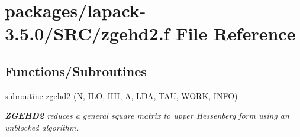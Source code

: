 \hypertarget{zgehd2_8f}{}\section{packages/lapack-\/3.5.0/\+S\+R\+C/zgehd2.f File Reference}
\label{zgehd2_8f}
\subsection*{Functions/\+Subroutines}
\begin{DoxyCompactItemize}
\item 
subroutine \hyperlink{group__complex16GEcomputational_ga8a81f8f7aca961fb59ef5b57256a5f68}{zgehd2} (\hyperlink{polmisc_8c_a0240ac851181b84ac374872dc5434ee4}{N}, I\+L\+O, I\+H\+I, \hyperlink{classA}{A}, \hyperlink{example__user_8c_ae946da542ce0db94dced19b2ecefd1aa}{L\+D\+A}, T\+A\+U, W\+O\+R\+K, I\+N\+F\+O)
\begin{DoxyCompactList}\small\item\em {\bfseries Z\+G\+E\+H\+D2} reduces a general square matrix to upper Hessenberg form using an unblocked algorithm. \end{DoxyCompactList}\end{DoxyCompactItemize}
